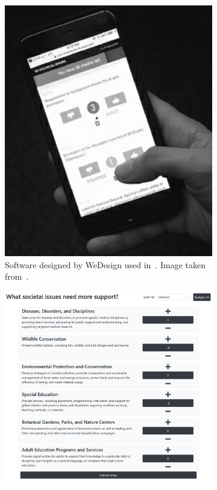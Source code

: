 \begin{figure}[ht]
    \centering
    \begin{subfigure}[b]{0.3\textwidth}
        \centering
        \includegraphics[width=\textwidth]{content/image/curr_interface/radical_market_wedesign.png}
        \caption{Software designed by WeDesign used in~\cite{quarfoot2017quadratic}. Image taken from~\cite{posner2018radical}.}
        \label{fig:wedesignInterface}
    \end{subfigure}
    \hfill
    \begin{subfigure}[b]{0.3\textwidth}
        \centering
        \includegraphics[width=\textwidth]{content/image/curr_interface/geek.sg_interface.png}

\end{subfigure}
\end{figure}
